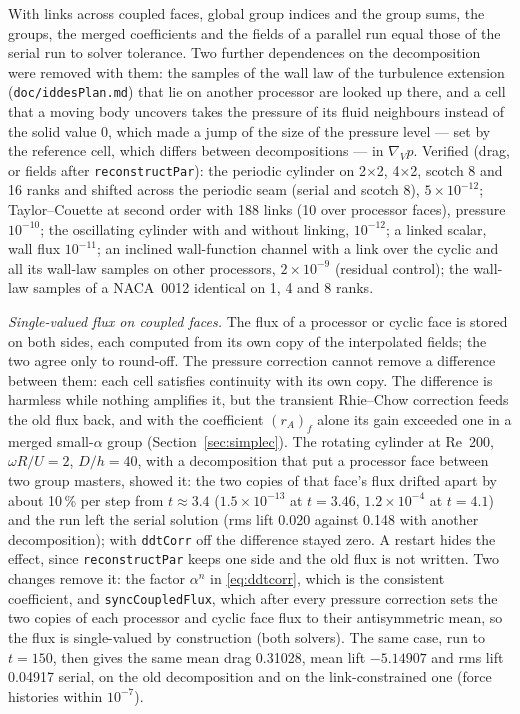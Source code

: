 \documentclass[11pt,a4paper]{article}
\theoremstyle{remark}
\newcommand{\code}[1]{\texttt{#1}}
\newcommand{\gradV}{\nabla_{\!V}}
\begin{document}
With links across coupled faces, global group indices and the group sums, the groups, the
merged coefficients and the fields of a parallel run equal those of the serial run to solver
tolerance. Two further dependences on the decomposition were removed with them: the samples of
the wall law of the turbulence extension (\code{doc/iddesPlan.md}) that lie on another
processor are looked up there, and a cell that a moving body uncovers takes the pressure of its
fluid neighbours instead of the solid value $0$, which made a jump of the size of the pressure
level --- set by the reference cell, which differs between decompositions --- in $\gradV p$.
Verified (drag, or fields after \code{reconstructPar}): the periodic cylinder on 2$\times$2,
4$\times$2, scotch 8 and 16 ranks and shifted across the periodic seam (serial and scotch 8),
$5\times10^{-12}$; Taylor--Couette at second order with 188 links (10 over processor faces),
pressure $10^{-10}$; the oscillating cylinder with and without linking, $10^{-12}$; a linked
scalar, wall flux $10^{-11}$; an inclined wall-function channel with a link over the cyclic and
all its wall-law samples on other processors, $2\times10^{-9}$ (residual control); the
wall-law samples of a NACA~0012 identical on 1, 4 and 8 ranks.

\emph{Single-valued flux on coupled faces.} The flux of a processor or cyclic face is stored on
both sides, each computed from its own copy of the interpolated fields; the two agree only to
round-off. The pressure correction cannot remove a difference between them: each cell satisfies
continuity with its own copy. The difference is harmless while nothing amplifies it, but the
transient Rhie--Chow correction feeds the old flux back, and with the coefficient $(r_A)_f$
alone its gain exceeded one in a merged small-$\alpha$ group (Section~\ref{sec:simplec}). The
rotating cylinder at Re~200, $\omega R/U=2$, $D/h=40$, with a decomposition that put a
processor face between two group masters, showed it: the two copies of that face's flux drifted
apart by about 10\,\% per step from $t\approx3.4$ ($1.5\times10^{-13}$ at $t=3.46$,
$1.2\times10^{-4}$ at $t=4.1$) and the run left the serial solution (rms lift 0.020 against
0.148 with another decomposition); with \code{ddtCorr} off the difference stayed zero. A restart
hides the effect, since \code{reconstructPar} keeps one side and the old flux is not written.
Two changes remove it: the factor $\alpha^n$ in \eqref{eq:ddtcorr}, which is the consistent
coefficient, and \code{syncCoupledFlux}, which after every pressure correction sets the two
copies of each processor and cyclic face flux to their antisymmetric mean, so the flux is
single-valued by construction (both solvers). The same case, run to $t=150$, then gives the
same mean drag 0.31028, mean lift $-5.14907$ and rms lift 0.04917 serial, on the old
decomposition and on the link-constrained one (force histories within $10^{-7}$).
\end{document}
